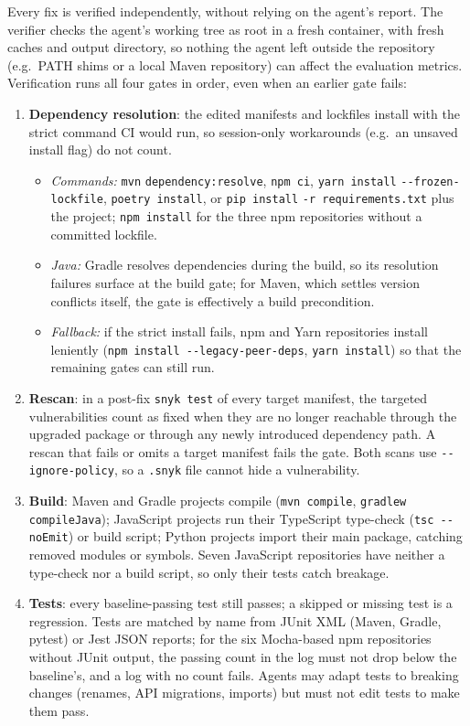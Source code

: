 \documentclass[11pt]{article}
\theoremstyle{definition}
\begin{document}
Every fix is verified independently, without relying on the agent's report. The verifier checks the agent's working tree as root in a fresh container, with fresh caches and output directory, so nothing the agent left outside the repository (e.g.\ PATH shims or a local Maven repository) can affect the evaluation metrics. Verification runs all four gates in order, even when an earlier gate fails:
\begin{enumerate}
  \item \textbf{Dependency resolution}: the edited manifests and lockfiles install with the strict command CI would run, so session-only workarounds (e.g.\ an unsaved install flag) do not count.
  \begin{itemize}
    \item \emph{Commands:} \texttt{mvn} \texttt{dependency:resolve}, \texttt{npm ci}, \texttt{yarn install} \texttt{-{}-frozen-lockfile}, \texttt{poetry install}, or \texttt{pip install} \texttt{-r requirements.txt} plus the project; \texttt{npm install} for the three npm repositories without a committed lockfile.
    \item \emph{Java:} Gradle resolves dependencies during the build, so its resolution failures surface at the build gate; for Maven, which settles version conflicts itself, the gate is effectively a build precondition.
    \item \emph{Fallback:} if the strict install fails, npm and Yarn repositories install leniently (\texttt{npm install -{}-legacy-peer-deps}, \texttt{yarn install}) so that the remaining gates can still run.
  \end{itemize}
  \item \textbf{Rescan}: in a post-fix \texttt{snyk test} of every target manifest, the targeted vulnerabilities count as fixed when they are no longer reachable through the upgraded package or through any newly introduced dependency path. A rescan that fails or omits a target manifest fails the gate. Both scans use \texttt{-{}-ignore-policy}, so a \texttt{.snyk} file cannot hide a vulnerability.
  \item \textbf{Build}: Maven and Gradle projects compile (\texttt{mvn compile}, \texttt{gradlew compileJava}); JavaScript projects run their TypeScript type-check (\texttt{tsc -{}-noEmit}) or build script; Python projects import their main package, catching removed modules or symbols. Seven JavaScript repositories have neither a type-check nor a build script, so only their tests catch breakage.
  \item \textbf{Tests}: every baseline-passing test still passes; a skipped or missing test is a regression. Tests are matched by name from JUnit XML (Maven, Gradle, pytest) or Jest JSON reports; for the six Mocha-based npm repositories without JUnit output, the passing count in the log must not drop below the baseline's, and a log with no count fails. Agents may adapt tests to breaking changes (renames, API migrations, imports) but must not edit tests to make them pass.
\end{enumerate}
\end{document}
